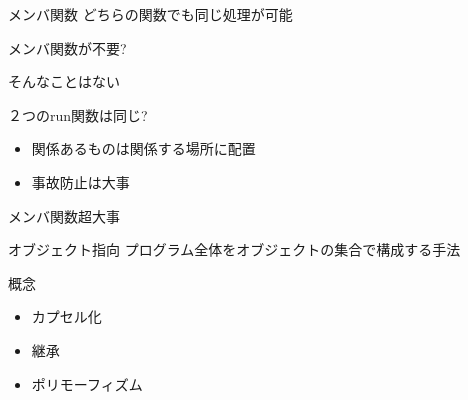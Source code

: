\documentclass[12pt, xetex, xcolor=pdftex, dvipsnames]{beamer}
\begin{document}
\begin{frame}{メンバ関数}
    どちらの関数でも同じ処理が可能

    \pause メンバ関数が不要?

    \pause \alert{そんなことはない}
\end{frame}
\begin{frame}[fragile]{２つのrun関数は同じ?}
    
    \begin{itemize}
        \item 関係あるものは関係する場所に配置
        \item 事故防止は大事
    \end{itemize}
    \pause
    \alert{メンバ関数超大事}
\end{frame}
\begin{frame}{オブジェクト指向}
    プログラム全体をオブジェクトの集合で構成する手法

    \begin{exampleblock}{概念}
        \begin{itemize}
            \item カプセル化
            \item 継承
            \item ポリモーフィズム
        \end{itemize}
    \end{exampleblock}
\end{frame}
\end{document}
